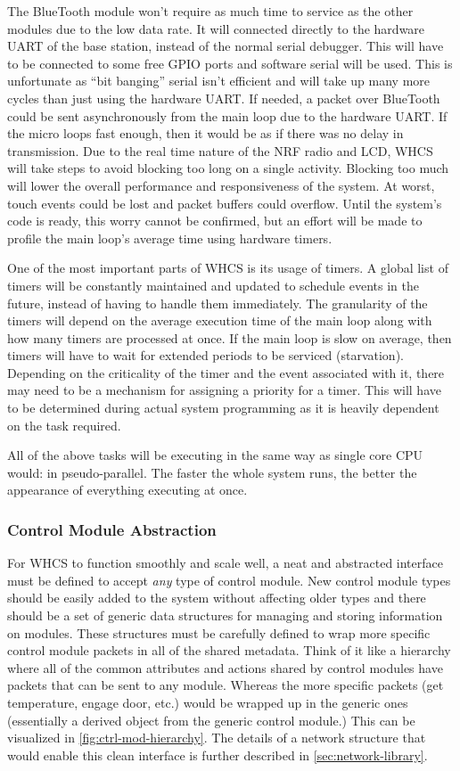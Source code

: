 The BlueTooth module won't require as much time to service as the other modules
due to the low data rate. It will connected directly to the hardware UART of
the base station, instead of the normal serial debugger. This will have to be
connected to some free GPIO ports and software serial will be used. This is
unfortunate as ``bit banging'' serial isn't efficient and will take up many
more cycles than just using the hardware UART. If needed, a packet over
BlueTooth could be sent asynchronously from the main loop due to the hardware
UART. If the micro loops fast enough, then it would be as if there was no delay
in transmission. Due to the real time nature of the NRF radio and LCD, WHCS
will take steps to avoid blocking too long on a single activity. Blocking too
much will lower the overall performance and responsiveness of the system. At
worst, touch events could be lost and packet buffers could overflow. Until the
system's code is ready, this worry cannot be confirmed, but an effort will be
made to profile the main loop's average time using hardware timers.

One of the most important parts of WHCS is its usage of timers. A global list
of timers will be constantly maintained and updated to schedule events
in the future, instead of having to handle them immediately. The granularity of
the timers will depend on the average execution time of the main loop along
with how many timers are processed at once. If the main loop is slow on
average, then timers will have to wait for extended periods to be serviced
(starvation). Depending on the criticality of the timer and the event
associated with it, there may need to be a mechanism for assigning a priority
for a timer. This will have to be determined during actual system programming
as it is heavily dependent on the task required.

All of the above tasks will be executing in the same way as single core CPU
would: in pseudo-parallel. The faster the whole system runs, the better the
appearance of everything executing at once.

\subsubsection{Control Module Abstraction}
For WHCS to function smoothly and scale well, a neat and abstracted interface
must be defined to accept \emph{any} type of control module. New control module
types should be easily added to the system without affecting older types and
there should be a set of generic data structures for managing and storing
information on modules. These structures must be carefully defined to wrap more
specific control module packets in all of the shared metadata. Think of it like
a hierarchy where all of the common attributes and actions shared by control
modules have packets that can be sent to any module. Whereas the more specific
packets (get temperature, engage door, etc.) would be wrapped up in the generic
ones (essentially a derived object from the generic control module.) This can
be visualized in \autoref{fig:ctrl-mod-hierarchy}. The
details of a network structure that would enable this clean interface is
further described in \autoref{sec:network-library}.


